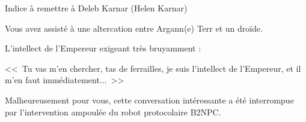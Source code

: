 \documentclass{article}
\begin{document}
\begin{samepage}
    Indice à remettre à Deleb Karnar (Helen Karnar)
    \nobreak
    \begin{framed}
        Vous avez assisté à une altercation entre Argann(e) Terr et un droïde.

        \nobreak

        L'intellect de l'Empereur exigeant très bruyamment :

        \nobreak

        <<~Tu vas m'en chercher, tas de ferrailles, je suis l'intellect de
        l'Empereur, et il m'en faut immédiatement...~>>

        \nobreak

        Malheureusement pour vous, cette conversation intéressante a été
        interrompue par l'intervention ampoulée du robot protocolaire B2NPC.
    \end{framed}
\end{samepage}
\end{document}
